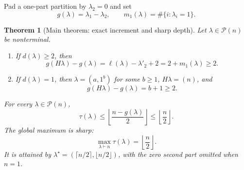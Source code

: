 \documentclass[10pt]{amsart}
\newtheorem{theorem}{Theorem}[section]
\theoremstyle{definition}
\newcommand{\Par}{\mathcal P}
\newcommand{\ellp}{\ell}
\begin{document}
Pad a one-part partition by $\lambda_2=0$ and set
\[
 g(\lambda)=\lambda_1-\lambda_2,
 \qquad
 m_1(\lambda)=\#\{i:\lambda_i=1\}.
\]

\begin{theorem}[Main theorem: exact increment and sharp depth]
\label{thm:gapdepth}
Let $\lambda\in\Par(n)$ be nonterminal.
\begin{enumerate}[label=\textup{(\roman*)}]
\item If $d(\lambda)\geq2$, then
\begin{equation}
 \label{eq:gapinc}
 g(H\lambda)-g(\lambda)
 =\ellp(\lambda)-\lambda'_2+2
 =2+m_1(\lambda)\geq2.
\end{equation}
\item If $d(\lambda)=1$, then
$\lambda=(a,1^b)$ for some $b\geq1$, $H\lambda=(n)$, and
\begin{equation}
 \label{eq:durfeeone}
 g(H\lambda)-g(\lambda)=b+1\geq2.
\end{equation}
\end{enumerate}
For every $\lambda\in\Par(n)$,
\begin{equation}
 \label{eq:pointbound}
 \tau(\lambda)\leq
 \left\lfloor\frac{n-g(\lambda)}2\right\rfloor
 \leq\left\lfloor\frac n2\right\rfloor.
\end{equation}
The global maximum is sharp:
\begin{equation}
 \label{eq:maxdepth}
 \max_{\lambda\vdash n}\tau(\lambda)=\left\lfloor\frac n2\right\rfloor.
\end{equation}
It is attained by
$\lambda^{\star}=(\lceil n/2\rceil,\lfloor n/2\rfloor)$, with the zero
second part omitted when $n=1$.
\end{theorem}
\end{document}
